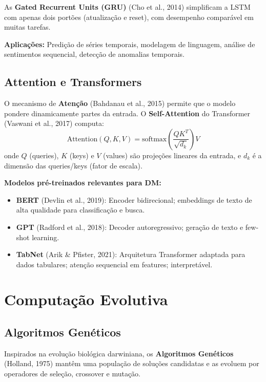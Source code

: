 \documentclass[12pt,a4paper]{article}
\begin{document}
As \textbf{Gated Recurrent Units (GRU)} (Cho et al., 2014) simplificam a LSTM com apenas dois portões (atualização e reset), com desempenho comparável em muitas tarefas.

\textbf{Aplicações:} Predição de séries temporais, modelagem de linguagem, análise de sentimentos sequencial, detecção de anomalias temporais.

\subsection{Attention e Transformers}

O mecanismo de \textbf{Atenção} (Bahdanau et al., 2015) permite que o modelo pondere dinamicamente partes da entrada. O \textbf{Self-Attention} do Transformer (Vaswani et al., 2017) computa:
\[
  \text{Attention}(Q, K, V) = \text{softmax}\!\left(\frac{QK^T}{\sqrt{d_k}}\right) V
\]
onde $Q$ (queries), $K$ (keys) e $V$ (values) são projeções lineares da entrada, e $d_k$ é a dimensão das queries/keys (fator de escala).

\textbf{Modelos pré-treinados relevantes para DM:}
\begin{itemize}
  \item \textbf{BERT} (Devlin et al., 2019): Encoder bidirecional; embeddings de texto de alta qualidade para classificação e busca.
  \item \textbf{GPT} (Radford et al., 2018): Decoder autoregressivo; geração de texto e few-shot learning.
  \item \textbf{TabNet} (Arik \& Pfister, 2021): Arquitetura Transformer adaptada para dados tabulares; atenção sequencial em features; interpretável.
\end{itemize}

\section{Computação Evolutiva}

\subsection{Algoritmos Genéticos}

Inspirados na evolução biológica darwiniana, os \textbf{Algoritmos Genéticos} (Holland, 1975) mantêm uma população de soluções candidatas e as evoluem por operadores de seleção, crossover e mutação.
\end{document}
